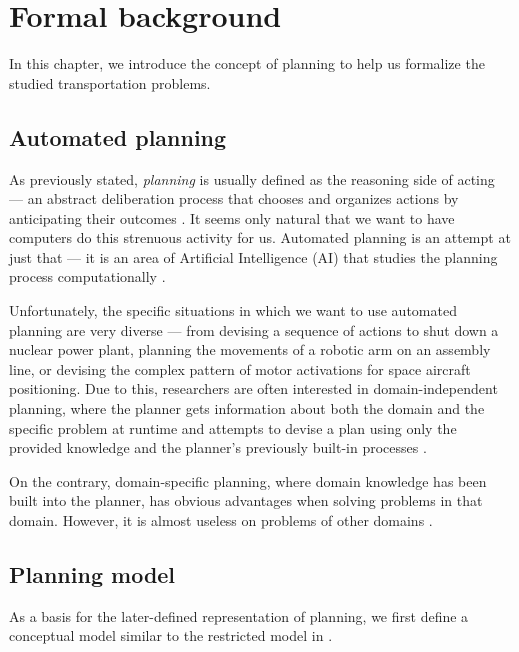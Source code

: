 \chapter{Formal background}

In this chapter, we introduce the concept of planning to help us  formalize the studied transportation problems.

\section{Automated planning}

As previously stated, \textit{planning} is usually defined as the reasoning side of acting --- an abstract deliberation
process that chooses and organizes actions by anticipating their outcomes
\citep[Section~1.1]{Ghallab2004}.
It seems only natural that we want to have computers do this strenuous activity for us.
Automated planning is an attempt at just that --- it is an area of Artificial Intelligence (AI) that
studies the planning process computationally \citep[Section~1.1]{Ghallab2004}.

Unfortunately, the specific situations in which we want to use automated planning are very diverse
--- from devising a sequence of actions to shut down a nuclear power plant,
planning the movements of a robotic arm
on an assembly line, or devising the complex pattern of motor activations
for space aircraft positioning.
Due to this, researchers are often interested in domain-independent planning,
where the planner gets information
about both the domain and the specific problem at runtime and attempts to devise a plan using only the provided knowledge
and the planner's previously built-in processes \citep[Section~1.3]{Ghallab2004}.

On the contrary, domain-specific planning, where domain knowledge has been built into the planner,
has obvious advantages when solving problems in that domain. However,
it is almost useless on problems of other
domains \citep[Section~1.3]{Ghallab2004}.

\section{Planning model}

As a basis for the later-defined representation of planning, we first define
a conceptual model similar to the restricted model in \citep[Section~1.4, Section~1.5]{Ghallab2004}.

